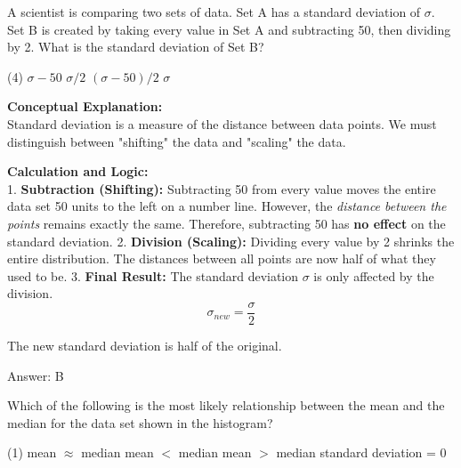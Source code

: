 \documentclass[11pt,paper=a4,answers]{exam}
\begin{document}
\begin{questions}
\question
A scientist is comparing two sets of data. Set A has a standard deviation of $\sigma$. Set B is created by taking every value in Set A and subtracting 50, then dividing by 2. What is the standard deviation of Set B?
\begin{tasks}(4)
    \task $\sigma - 50$
    \task $\sigma / 2$
    \task $(\sigma - 50) / 2$
    \task $\sigma$
\end{tasks}

\begin{solution}
\textbf{Conceptual Explanation:} \\
Standard deviation is a measure of the distance between data points. We must distinguish between "shifting" the data and "scaling" the data.

\vspace{30pt}

\textbf{Calculation and Logic:} \\
1. \textbf{Subtraction (Shifting):} Subtracting 50 from every value moves the entire data set 50 units to the left on a number line. However, the \textit{distance between the points} remains exactly the same. Therefore, subtracting 50 has \textbf{no effect} on the standard deviation.
2. \textbf{Division (Scaling):} Dividing every value by 2 shrinks the entire distribution. The distances between all points are now half of what they used to be.
3. \textbf{Final Result:} The standard deviation $\sigma$ is only affected by the division.
\[ \sigma_{new} = \frac{\sigma}{2} \]

\vspace{20pt}

The new standard deviation is half of the original.

\vspace{30pt}

Answer: \colorbox{yellow!100}{B}
\end{solution}

\vspace{60pt}

\question
\begin{center}
\end{center}
Which of the following is the most likely relationship between the mean and the median for the data set shown in the histogram?
\begin{tasks}(1)
    \task mean $\approx$ median
    \task mean $<$ median
    \task mean $>$ median
    \task standard deviation = 0
\end{tasks}


\end{questions}
\end{document}
